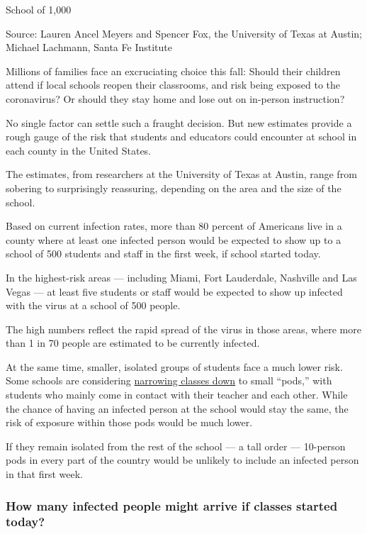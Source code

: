 School of 1,000

Source: Lauren Ancel Meyers and Spencer Fox, the University of Texas at
Austin; Michael Lachmann, Santa Fe Institute

Millions of families face an excruciating choice this fall: Should their
children attend if local schools reopen their classrooms, and risk being
exposed to the coronavirus? Or should they stay home and lose out on
in-person instruction?

No single factor can settle such a fraught decision. But new estimates
provide a rough gauge of the risk that students and educators could
encounter at school in each county in the United States.

The estimates, from researchers at the University of Texas at Austin,
range from sobering to surprisingly reassuring, depending on the area
and the size of the school.

Based on current infection rates, more than 80 percent of Americans live
in a county where at least one infected person would be expected to show
up to a school of 500 students and staff in the first week, if school
started today.

In the highest-risk areas --- including Miami, Fort Lauderdale,
Nashville and Las Vegas --- at least five students or staff would be
expected to show up infected with the virus at a school of 500 people.

The high numbers reflect the rapid spread of the virus in those areas,
where more than 1 in 70 people are estimated to be currently infected.

At the same time, smaller, isolated groups of students face a much lower
risk. Some schools are considering
\href{https://www.nytimes3xbfgragh.onion/interactive/2020/07/29/us/schools-reopening-coronavirus.html}{narrowing
classes down} to small ``pods,'' with students who mainly come in
contact with their teacher and each other. While the chance of having an
infected person at the school would stay the same, the risk of exposure
within those pods would be much lower.

If they remain isolated from the rest of the school --- a tall order ---
10-person pods in every part of the country would be unlikely to include
an infected person in that first week.

\hypertarget{how-many-infected-people-might-arrive-if-classes-started-today}{%
\subsubsection{How many infected people might arrive if classes started
today?}\label{how-many-infected-people-might-arrive-if-classes-started-today}}

